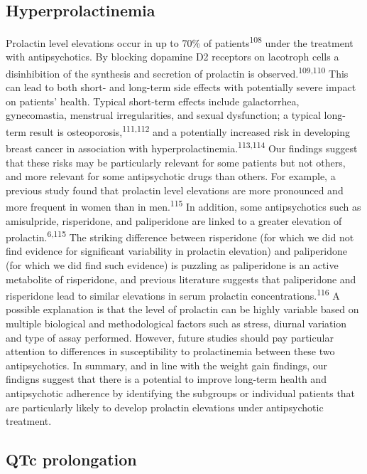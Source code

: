 \documentclass[
  9pt,
  english,
  ,jou,floatsintext]{apa6}
\begin{document}
\hypertarget{hyperprolactinemia-1}{%
\subsection{Hyperprolactinemia}\label{hyperprolactinemia-1}}

Prolactin level elevations occur in up to 70\% of patients\textsuperscript{108}
under the treatment with antipsychotics. By blocking dopamine D2
receptors on lacotroph cells a disinhibition of the synthesis and
secretion of prolactin is observed.\textsuperscript{109,110} This
can lead to both short- and long-term side effects with potentially
severe impact on patients' health. Typical short-term effects include
galactorrhea, gynecomastia, menstrual irregularities, and sexual
dysfunction; a typical long-term result is
osteoporosis,\textsuperscript{111,112} and a potentially increased
risk in developing breast cancer in association with
hyperprolactinemia.\textsuperscript{113,114} Our findings suggest
that these risks may be particularly relevant for some patients but
not others, and more relevant for some antipsychotic drugs than
others. For example, a previous study found that prolactin level
elevations are more pronounced and more frequent in women than in
men.\textsuperscript{115} In addition, some antipsychotics such as
amisulpride, risperidone, and paliperidone are linked to a greater
elevation of prolactin.\textsuperscript{6,115} The striking
difference between risperidone (for which we did not find evidence for
significant variability in prolactin elevation) and paliperidone (for
which we did find such evidence) is puzzling as paliperidone is an
active metabolite of risperidone, and previous literature suggests
that paliperidone and risperidone lead to similar elevations in serum
prolactin concentrations.\textsuperscript{116} A possible
explanation is that the level of prolactin can be highly variable
based on multiple biological and methodological factors such as
stress, diurnal variation and type of assay performed. However, future
studies should pay particular attention to differences in
susceptibility to prolactinemia between these two antipsychotics. In
summary, and in line with the weight gain findings, our findigns
suggest that there is a potential to improve long-term health and
antipsychotic adherence by identifying the subgroups or individual
patients that are particularly likely to develop prolactin elevations
under antipsychotic treatment.

\hypertarget{qtc-prolongation-1}{%
\subsection{QTc prolongation}\label{qtc-prolongation-1}}
\end{document}
